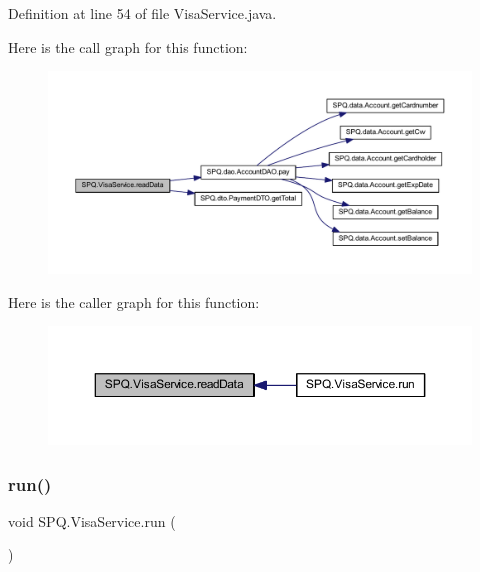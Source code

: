 Definition at line 54 of file Visa\+Service.\+java.

Here is the call graph for this function\+:\nopagebreak
\begin{figure}[H]
\begin{center}
\leavevmode
\includegraphics[width=350pt]{class_s_p_q_1_1_visa_service_a9f06022375e8bd98b78a8268bdc4ff05_cgraph}
\end{center}
\end{figure}
Here is the caller graph for this function\+:\nopagebreak
\begin{figure}[H]
\begin{center}
\leavevmode
\includegraphics[width=350pt]{class_s_p_q_1_1_visa_service_a9f06022375e8bd98b78a8268bdc4ff05_icgraph}
\end{center}
\end{figure}
\mbox{\label{class_s_p_q_1_1_visa_service_a4e9434dfb98d1ff247d29794ac96909e}} 
\subsubsection{\texorpdfstring{run()}{run()}}
{\footnotesize\ttfamily void S\+P\+Q.\+Visa\+Service.\+run (\begin{DoxyParamCaption}{ }\end{DoxyParamCaption})}



